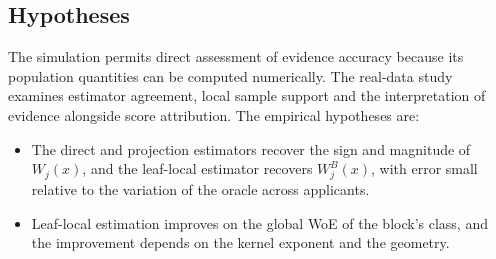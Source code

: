 \subsection{Hypotheses}

The simulation permits direct assessment of evidence accuracy because its population quantities can be computed numerically. The real-data study examines estimator agreement, local sample support and the interpretation of evidence alongside score attribution. The empirical hypotheses are:
\begin{itemize}
\item[H1.] The direct and projection estimators recover the sign and magnitude of $W_j(x)$, and the leaf-local estimator recovers $W^B_j(x)$, with error small relative to the variation of the oracle across applicants.
\item[H2.] Leaf-local estimation improves on the global WoE of the block's class, and the improvement depends on the kernel exponent and the geometry.
\end{itemize}






